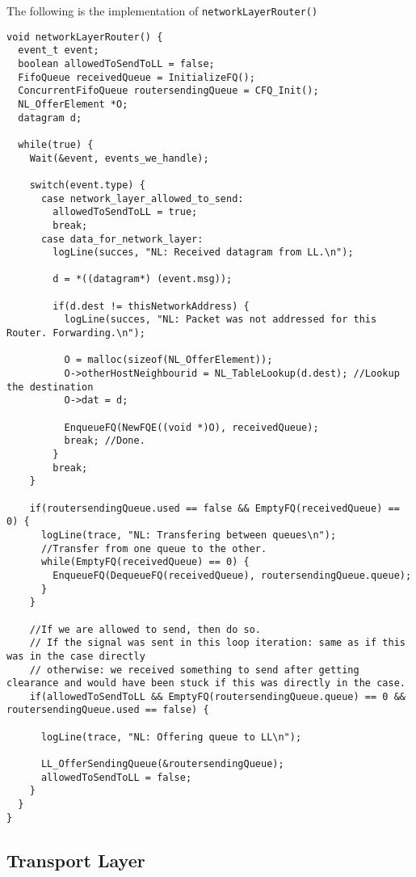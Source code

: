 The following is the implementation of \texttt{networkLayerRouter()}%
\begin{lstlisting}
void networkLayerRouter() {
  event_t event;
  boolean allowedToSendToLL = false;
  FifoQueue receivedQueue = InitializeFQ();
  ConcurrentFifoQueue routersendingQueue = CFQ_Init();
  NL_OfferElement *O;
  datagram d;

  while(true) {
    Wait(&event, events_we_handle);

    switch(event.type) {
      case network_layer_allowed_to_send:
        allowedToSendToLL = true;
        break;
      case data_for_network_layer:
        logLine(succes, "NL: Received datagram from LL.\n");

        d = *((datagram*) (event.msg));

        if(d.dest != thisNetworkAddress) {
          logLine(succes, "NL: Packet was not addressed for this Router. Forwarding.\n");

          O = malloc(sizeof(NL_OfferElement));
          O->otherHostNeighbourid = NL_TableLookup(d.dest); //Lookup the destination
          O->dat = d;

          EnqueueFQ(NewFQE((void *)O), receivedQueue);
          break; //Done.
        }
        break;
    }

    if(routersendingQueue.used == false && EmptyFQ(receivedQueue) == 0) {
      logLine(trace, "NL: Transfering between queues\n");
      //Transfer from one queue to the other.
      while(EmptyFQ(receivedQueue) == 0) {
        EnqueueFQ(DequeueFQ(receivedQueue), routersendingQueue.queue);
      }
    }

    //If we are allowed to send, then do so.
    // If the signal was sent in this loop iteration: same as if this was in the case directly
    // otherwise: we received something to send after getting clearance and would have been stuck if this was directly in the case.
    if(allowedToSendToLL && EmptyFQ(routersendingQueue.queue) == 0 && routersendingQueue.used == false) {

      logLine(trace, "NL: Offering queue to LL\n");

      LL_OfferSendingQueue(&routersendingQueue);
      allowedToSendToLL = false;
    }
  }
}
\end{lstlisting}



\subsection{Transport Layer}

